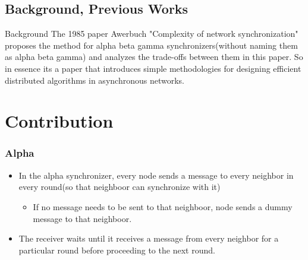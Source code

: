 \documentclass[11pt]{beamer}              %
\begin{document}

\subsection{Background, Previous Works}
\begin{frame}{Background}
	The 1985 paper Awerbuch "Complexity of network synchronization" proposes the method for alpha beta gamma synchronizers(without naming them as alpha beta gamma) and analyzes the trade-offs between them in this paper. So in essence its a paper that introduces simple methodologies for designing efficient distributed algorithms in asynchronous networks.
	
\end{frame}




\section{Contribution}

\begin{frame}
	\frametitle{Alpha}
	
	\begin{itemize}
		\item In the alpha synchronizer, every node sends a message to every neighbor in every round(so that neighboor can synchronize with it)
		\begin{itemize}
			\item If no message needs to be sent to that neighboor, node sends a dummy message to that neighboor.
		\end{itemize}
		\item The receiver waits until it receives a message from every neighbor for a particular round before proceeding to the next round.
	\end{itemize}
	
\end{frame}
\end{document}
